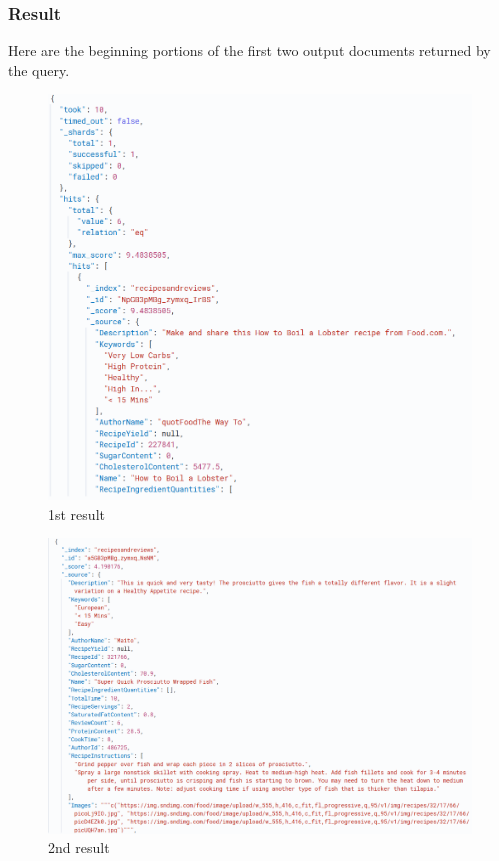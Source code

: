 \begin{enumerate}
    \subsubsection{Result}
    Here are the beginning portions of the first two output documents returned by the query.
    \begin{figure}[H]
    \centering
    \includegraphics[width=0.8\linewidth]{Report/ReportLatex/Images/ElasticsearchResults/proteins1.png}
    \caption{1st result}
    \label{fig:enter-label}
    \end{figure}
    \begin{figure}[H]
    \centering
    \includegraphics[width=0.8\linewidth]{Report/ReportLatex/Images/ElasticsearchResults/proteins2.png}
    \caption{2nd result}
    \label{fig:enter-label}
    \end{figure}
    
    \clearpage
    

\end{enumerate}
